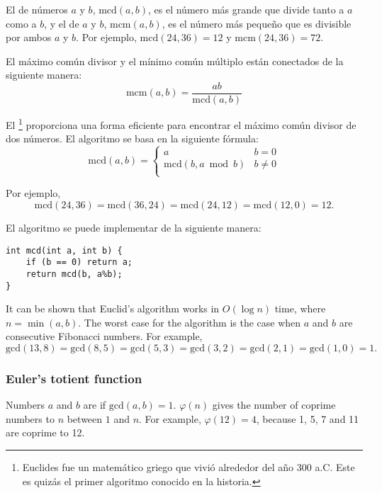 
El  de
números $a$ y $b$, $\textrm{mcd}(a,b)$,
es el número más grande que divide tanto a $a$ como a $b$,
y el  de
$a$ y $b$, $\textrm{mcm}(a,b)$,
es el número más pequeño que es divisible por
ambos $a$ y $b$.
Por ejemplo,
$\textrm{mcd}(24,36)=12$ y
$\textrm{mcm}(24,36)=72$.

El máximo común divisor y el mínimo común múltiplo
están conectados de la siguiente manera:
\[\textrm{mcm}(a,b)=\frac{ab}{\textrm{mcd}(a,b)}\]

El \footnote{Euclides fue un matemático griego que
vivió alrededor del año 300 a.C. Este es quizás el primer algoritmo conocido en la historia.} proporciona una forma eficiente
para encontrar el máximo común divisor de dos números.
El algoritmo se basa en la siguiente fórmula:
\begin{equation*}
    \textrm{mcd}(a,b) = \begin{cases}
               a        & b = 0\\
               \textrm{mcd}(b,a \bmod b) & b \neq 0\\
           \end{cases}
\end{equation*}

Por ejemplo,
\[\textrm{mcd}(24,36) = \textrm{mcd}(36,24)= \textrm{mcd}(24,12) = \textrm{mcd}(12,0)=12.\]

El algoritmo se puede implementar de la siguiente manera:
\begin{lstlisting}
int mcd(int a, int b) {
    if (b == 0) return a;
    return mcd(b, a%b);
}
\end{lstlisting}

It can be shown that Euclid's algorithm works
in $O(\log n)$ time, where $n=\min(a,b)$.
The worst case for the algorithm is
the case when $a$ and $b$ are consecutive Fibonacci numbers.
For example,
\[\textrm{gcd}(13,8)=\textrm{gcd}(8,5)
=\textrm{gcd}(5,3)=\textrm{gcd}(3,2)=\textrm{gcd}(2,1)=\textrm{gcd}(1,0)=1.\]

\subsubsection{Euler's totient function}


Numbers $a$ and $b$ are 
if $\textrm{gcd}(a,b)=1$.
 $\varphi(n)$
gives the number of coprime numbers to $n$
between $1$ and $n$.
For example, $\varphi(12)=4$,
because 1, 5, 7 and 11
are coprime to 12.

